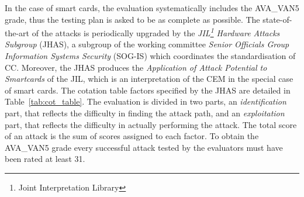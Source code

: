 In the case of smart cards, the evaluation systematically includes the AVA\_VAN5 grade, thus the testing plan is asked to be as complete as possible. The state-of-the-art of the attacks is periodically upgraded by the \emph{JIL\footnote{Joint Interpretation Library} Hardware Attacks Subgroup} (JHAS), a subgroup of the working committee \emph{Senior Officials Group Information Systems Security} (SOG-IS) which coordinates the standardisation of CC. Moreover, the JHAS produces the \emph{Application of Attack Potential to Smartcards} \cite{JIL} of the JIL, which is an interpretation of the CEM in the special case of smart cards. The cotation table factors specified by the JHAS are detailed in Table~\ref{tab:cot_table}. The evaluation is divided in two parts, an \emph{identification} part, that reflects the difficulty in finding the attack path, and an \emph{exploitation} part, that reflects the difficulty in actually performing the attack. The total score of an attack is the sum of scores assigned to each factor. To obtain the AVA\_VAN5 grade every successful attack tested by the evaluators must have been rated at least 31.\\



